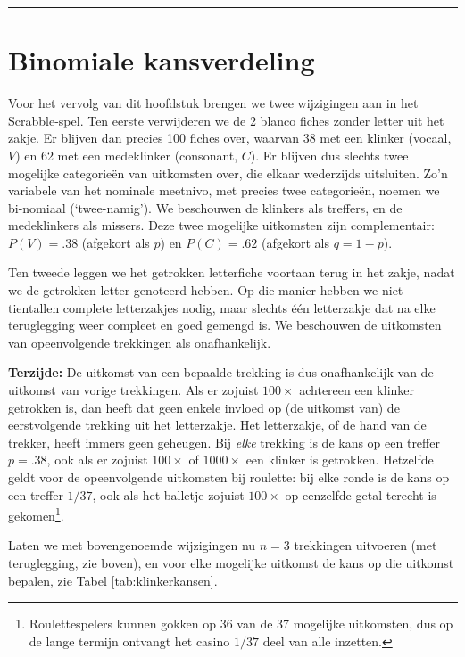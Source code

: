 \documentclass[
]{book}
\begin{document}
\begin{center}\rule{0.5\linewidth}{0.5pt}\end{center}

\hypertarget{sec:binomiaalverdeling}{%
\section{Binomiale kansverdeling}\label{sec:binomiaalverdeling}}

Voor het vervolg van dit hoofdstuk brengen we twee wijzigingen aan in
het Scrabble-spel. Ten eerste verwijderen we de 2 blanco fiches zonder
letter uit het zakje. Er blijven dan precies 100 fiches over, waarvan 38
met een klinker (vocaal, \(V\)) en 62 met een medeklinker (consonant,
\(C\)). Er blijven dus slechts twee mogelijke categorieën van uitkomsten
over, die elkaar wederzijds uitsluiten. Zo'n variabele van het nominale
meetnivo, met precies twee categorieën, noemen we bi-nomiaal
(`twee-namig'). We beschouwen de klinkers als treffers, en de
medeklinkers als missers. Deze twee mogelijke uitkomsten zijn
complementair: \(P(V)=.38\) (afgekort als \(p\)) en \(P(C)=.62\) (afgekort als
\(q=1-p\)).

Ten tweede leggen we het getrokken letterfiche voortaan terug in het
zakje, nadat we de getrokken letter genoteerd hebben. Op die manier
hebben we niet tientallen complete letterzakjes nodig, maar slechts één
letterzakje dat na elke teruglegging weer compleet en goed gemengd is.
We beschouwen de uitkomsten van opeenvolgende trekkingen als
onafhankelijk.

\textbf{Terzijde:} De uitkomst van een bepaalde trekking is dus onafhankelijk
van de uitkomst van vorige trekkingen. Als er zojuist \(100\times\)
achtereen een klinker getrokken is, dan heeft dat geen enkele invloed op
(de uitkomst van) de eerstvolgende trekking uit het letterzakje. Het
letterzakje, of de hand van de trekker, heeft immers geen geheugen. Bij
\emph{elke} trekking is de kans op een treffer \(p=.38\), ook als er zojuist
\(100\times\) of \(1000\times\) een klinker is getrokken. Hetzelfde geldt
voor de opeenvolgende uitkomsten bij roulette: bij elke ronde is de kans
op een treffer \(1/37\), ook als het balletje zojuist \(100\times\) op
eenzelfde getal terecht is gekomen\footnote{Roulettespelers kunnen gokken op 36 van de 37 mogelijke uitkomsten, dus op de lange termijn ontvangt het casino \(1/37\) deel van alle inzetten.}.

Laten we met bovengenoemde wijzigingen nu \(n=3\) trekkingen uitvoeren
(met teruglegging, zie boven), en voor elke mogelijke uitkomst de kans
op die uitkomst bepalen, zie
Tabel \ref{tab:klinkerkansen}.
\end{document}
